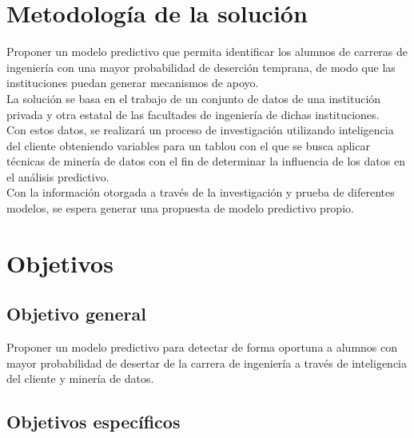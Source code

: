 \section{Metodología de la solución}
\label{sec:descripcion}

Proponer un modelo predictivo que permita identificar los alumnos de carreras de ingeniería con una mayor probabilidad de deserción temprana, de modo que las instituciones puedan generar mecanismos de apoyo.\\

La solución se basa en el trabajo de un conjunto de datos de una institución privada y otra estatal de las facultades de ingeniería de dichas instituciones.\\

Con estos datos, se realizará un proceso de investigación utilizando inteligencia del cliente obteniendo variables para un tablou con el que se busca aplicar técnicas de minería de datos con el fin de determinar la influencia de los datos en el análisis predictivo.\\

Con la información otorgada a través de la investigación y prueba de diferentes modelos, se espera generar una propuesta de modelo predictivo propio. \\


\section{Objetivos}
\label{sec:objetivos}

\subsection{Objetivo general}

Proponer un modelo predictivo para detectar de forma oportuna a alumnos con mayor probabilidad de desertar de la carrera de ingeniería a través de inteligencia del cliente y minería de datos.

\subsection{Objetivos específicos}

